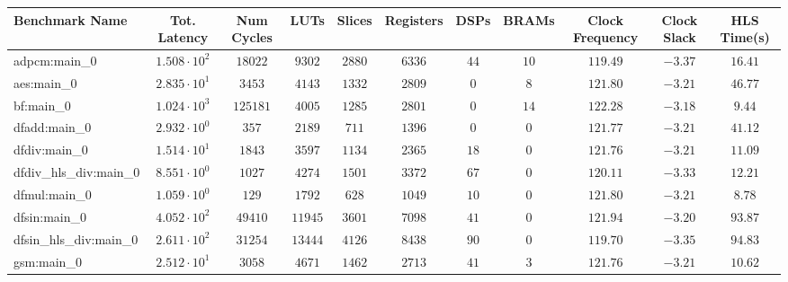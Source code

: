 \begin{tabular}{|l|c|c|c|c|c|c|c|c|c|c|}
\hline
Benchmark Name          & Tot. Latency           & Num Cycles & LUTs      & Slices    & Registers & DSPs    & BRAMs   & Clock Frequency & Clock Slack & HLS Time(s) \\
\hline
adpcm:main\_0           & $ 1.508 \cdot 10^{2} $ & $ 18022  $ & $ 9302  $ & $ 2880  $ & $ 6336  $ & $ 44  $ & $ 10  $ & $ 119.49      $ & $ -3.37   $ & $ 16.41   $ \\
aes:main\_0             & $ 2.835 \cdot 10^{1} $ & $ 3453   $ & $ 4143  $ & $ 1332  $ & $ 2809  $ & $ 0   $ & $ 8   $ & $ 121.80      $ & $ -3.21   $ & $ 46.77   $ \\
bf:main\_0              & $ 1.024 \cdot 10^{3} $ & $ 125181 $ & $ 4005  $ & $ 1285  $ & $ 2801  $ & $ 0   $ & $ 14  $ & $ 122.28      $ & $ -3.18   $ & $ 9.44    $ \\
dfadd:main\_0           & $ 2.932 \cdot 10^{0} $ & $ 357    $ & $ 2189  $ & $ 711   $ & $ 1396  $ & $ 0   $ & $ 0   $ & $ 121.77      $ & $ -3.21   $ & $ 41.12   $ \\
dfdiv:main\_0           & $ 1.514 \cdot 10^{1} $ & $ 1843   $ & $ 3597  $ & $ 1134  $ & $ 2365  $ & $ 18  $ & $ 0   $ & $ 121.76      $ & $ -3.21   $ & $ 11.09   $ \\
dfdiv\_hls\_div:main\_0 & $ 8.551 \cdot 10^{0} $ & $ 1027   $ & $ 4274  $ & $ 1501  $ & $ 3372  $ & $ 67  $ & $ 0   $ & $ 120.11      $ & $ -3.33   $ & $ 12.21   $ \\
dfmul:main\_0           & $ 1.059 \cdot 10^{0} $ & $ 129    $ & $ 1792  $ & $ 628   $ & $ 1049  $ & $ 10  $ & $ 0   $ & $ 121.80      $ & $ -3.21   $ & $ 8.78    $ \\
dfsin:main\_0           & $ 4.052 \cdot 10^{2} $ & $ 49410  $ & $ 11945 $ & $ 3601  $ & $ 7098  $ & $ 41  $ & $ 0   $ & $ 121.94      $ & $ -3.20   $ & $ 93.87   $ \\
dfsin\_hls\_div:main\_0 & $ 2.611 \cdot 10^{2} $ & $ 31254  $ & $ 13444 $ & $ 4126  $ & $ 8438  $ & $ 90  $ & $ 0   $ & $ 119.70      $ & $ -3.35   $ & $ 94.83   $ \\
gsm:main\_0             & $ 2.512 \cdot 10^{1} $ & $ 3058   $ & $ 4671  $ & $ 1462  $ & $ 2713  $ & $ 41  $ & $ 3   $ & $ 121.76      $ & $ -3.21   $ & $ 10.62   $ \\

\end{tabular}
